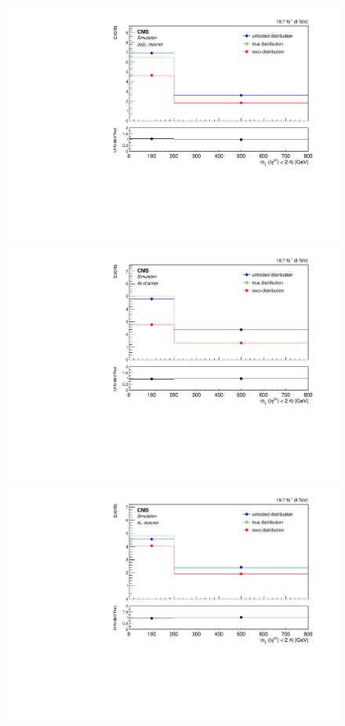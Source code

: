 \begin{figure}[hbtp]
\begin{center}
    \includegraphics[width=0.8\cmsFigWidth]{Figures/Unfolding/MCTests/CentralMjj_ZZTo2e2m_MadMatrix_PowDistr_FullSample_fr}
     \includegraphics[width=0.8\cmsFigWidth]{Figures/Unfolding/MCTests/CentralMjj_ZZTo4e_PowMatrix_MadDistr_FullSample_fr}     
    \includegraphics[width=0.8\cmsFigWidth]{Figures/Unfolding/MCTests/CentralMjj_ZZTo4m_PowMatrix_MadDistr_FullSample_fr}     

\end{center}
\end{figure}
